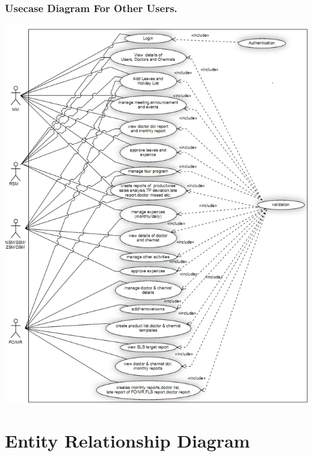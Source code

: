 \subsubsection{Usecase Diagram For Other Users.}
\includegraphics[scale=0.8]{Diag/usecaseall.png}

\label{fig:Use case diagram For Other User}



%




\section{Entity Relationship Diagram}

